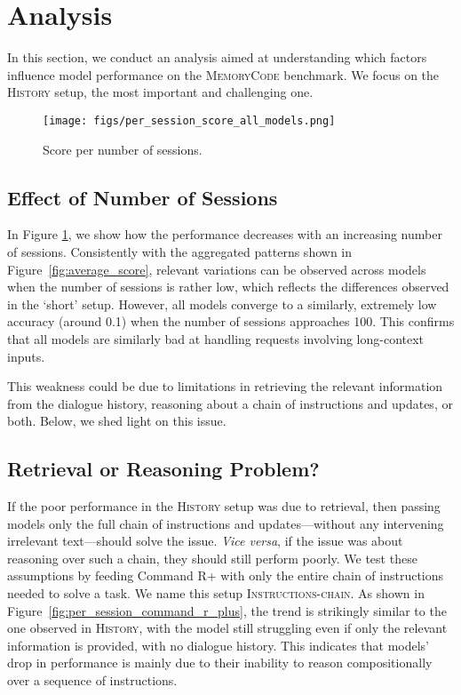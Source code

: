 \section{Analysis}
\label{sec:analysis}

In this section, we conduct an analysis aimed at understanding which factors influence model performance on the \textsc{MemoryCode} benchmark. We focus on the \textsc{History} setup, the most important and challenging one. 

\begin{figure}[hbt!]
    \centering
    \texttt{[image: figs/per\_session\_score\_all\_models.png]}
        \caption{Score per number of sessions.}
    \label{fig:per_session_score_all_models}
\end{figure}

\subsection{Effect of Number of Sessions} 
\label{subsec:effect_number_sessions}

In Figure \ref{fig:per_session_score_all_models}, we show how the performance decreases with an increasing number of sessions. 
Consistently with the aggregated patterns shown in Figure~\ref{fig:average_score}, 
relevant variations can be observed across models when the number of sessions is rather low, which reflects the differences observed in the `short' setup. 
However, all models converge to a similarly, extremely low accuracy (around 0.1) when the number of sessions approaches 100. This confirms that all models are similarly bad at handling requests involving long-context inputs. 
 
This weakness could be due to limitations in retrieving the relevant information from the dialogue history, reasoning about a chain of instructions and updates, or both.
Below, we shed light on this issue. 

\subsection{Retrieval or Reasoning Problem?}
\label{subsec:retrieval_or_reasoning_problem}

If the poor performance in the \textsc{History} setup was due to retrieval, then passing models only the full chain of instructions and updates---without any intervening irrelevant text---should solve the issue. 
\textit{Vice versa}, if the issue was about reasoning over such a chain, 
they should still perform poorly.
We test these assumptions by feeding Command R+ with only the entire chain of instructions needed to solve a task. We name this setup \textsc{Instructions-chain}. 
As shown in Figure~\ref{fig:per_session_command_r_plus}, the trend is strikingly similar to the one observed in \textsc{History}, with the model still struggling even if only the relevant information is provided, with no dialogue history.
This indicates that models' drop in performance is mainly due to their inability to reason compositionally over a sequence of instructions. 

